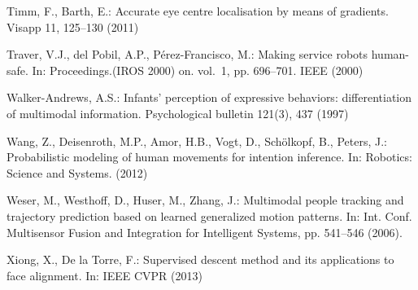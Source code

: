 \documentclass[runningheads,a4paper]{llncs}
\begin{document}
\begin{thebibliography}{4}
Timm, F., Barth, E.: Accurate eye centre localisation by means of gradients.
  Visapp  11,  125--130 (2011)

Traver, V.J., del Pobil, A.P., P{\'e}rez-Francisco, M.: Making service robots
  human-safe. In: Proceedings.(IROS 2000) on. vol.~1, pp. 696--701.  IEEE (2000)

Walker-Andrews, A.S.: Infants' perception of expressive behaviors:
  differentiation of multimodal information. Psychological bulletin  121(3),
  437 (1997)

Wang, Z., Deisenroth, M.P., Amor, H.B., Vogt, D., Sch{\"o}lkopf, B., Peters,
  J.: Probabilistic modeling of human movements for intention inference. In:
  Robotics: Science and Systems. (2012)

Weser, M., Westhoff, D., Huser, M., Zhang, J.: Multimodal people tracking and
  trajectory prediction based on learned generalized motion patterns. In: Int. Conf. Multisensor Fusion and Integration for Intelligent Systems, pp. 541--546 (2006). 

Xiong, X., {De la Torre}, F.: Supervised descent method and its applications to
  face alignment. In: IEEE CVPR (2013)

\end{thebibliography}
%
%
%
%

%
\end{document}
